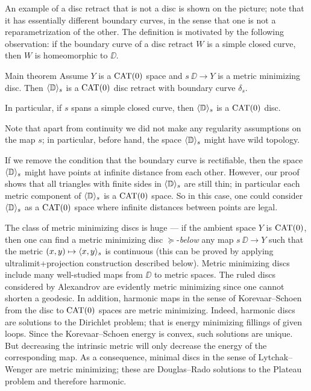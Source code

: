 \documentclass{article}
\begin{document}
An example of a disc retract that is not a disc is shown on the picture;
note that it has essentially different boundary curves,
in the sense that one is not a reparametrization of the other.
The definition is motivated by the following observation: if the boundary curve of a disc retract $W$ is a simple closed curve, then $W$ is homeomorphic to $\DD$.




\begin{thm}{Main theorem}\label{thm:main}
Assume $Y$ is a $\mathop{\rm CAT}\nolimits(0)$ space and $s\:\DD\to Y$ is a metric minimizing disc.
Then $\langle\mathbb{D}\rangle_s$ is a $\mathop{\rm CAT}\nolimits(0)$ disc retract with boundary curve $\delta_s$.

In particular, if $s$ spans a simple closed curve, then $\langle\mathbb{D}\rangle_s$ is a $\mathop{\rm CAT}\nolimits(0)$ disc.
\end{thm}



Note that apart from continuity we did not make any regularity assumptions on the map $s$;
in particular, before hand, the space $\langle\mathbb{D}\rangle_s$ might have wild topology.

If we remove the condition that the boundary curve is rectifiable, then the space $\langle\mathbb{D}\rangle_s$ might have points at infinite distance from each other.
However, our proof shows that all triangles with finite sides in $\langle\mathbb{D}\rangle_s$ are still thin; 
in particular each metric component of $\langle\mathbb{D}\rangle_s$ is a $\mathop{\rm CAT}\nolimits(0)$ space.
So in this case, one could consider $\langle\mathbb{D}\rangle_s$ as a $\mathop{\rm CAT}\nolimits(0)$ space where infinite distances between points are legal.

The class of metric minimizing discs is huge --- if the ambient space $Y$ is $\mathop{\rm CAT}\nolimits(0)$, then one can find a 
metric minimizing  disc $\succcurlyeq$-\emph{below} 
any map $s\:\DD\to Y$ such that the metric $(x,y)\mapsto\langle x,y\rangle_s$ is continuous
(this can be proved by applying ultralimit+projection construction described below).
Metric minimizing discs include many well-studied maps from $\DD$ to metric spaces.
The ruled discs considered by Alexandrov \cite{A} are evidently metric minimizing since one cannot shorten a geodesic. 
In addition, harmonic maps in the sense of Korevaar--Schoen \cite{KS} from the disc to $\mathop{\rm CAT}\nolimits(0)$ spaces are metric minimizing.
Indeed, harmonic discs are solutions to the Dirichlet problem;
that is energy minimizing fillings of given loops.
Since the Korevaar--Schoen energy is convex, such solutions are unique. But decreasing the intrinsic metric will only decrease the energy of the corresponding map.
As a consequence, minimal discs in the sense of Lytchak--Wenger \cite{LW} are metric minimizing;
these are Douglas--Rado solutions to the Plateau problem and therefore harmonic. 
\end{document}
